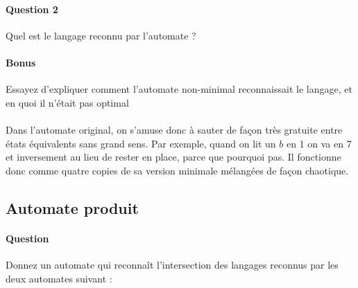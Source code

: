 \documentclass{article}[11pt]
\theoremstyle{definition}
\begin{document}
\paragraph{Question 2} Quel est le langage reconnu par l'automate ?

\paragraph{Bonus} Essayez d'expliquer comment l'automate non-minimal reconnaissait le langage, et en quoi il n'était pas optimal

\paragraph{} Dans l'automate original, on s'amuse donc à sauter de façon très gratuite entre états équivalents sans grand sens. Par exemple, quand on lit un $b$ en 1 on va en 7 et inversement au lieu de rester en place, parce que pourquoi pas. Il fonctionne donc comme quatre copies de sa version minimale mélangées de façon chaotique.

\subsection{Automate produit}

\paragraph{Question} Donnez un automate qui reconnaît l'intersection des langages reconnus par les deux automates suivant :
\end{document}
